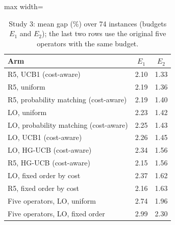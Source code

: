 \begin{table}[t]
\caption{Study 3: mean gap (\%) over 74 instances (budgets $E_1$ and $E_2$); the last two rows use the original five operators with the same budget.}\label{tab:s3}
\centering
\small
\begin{adjustbox}{max width=\linewidth}
\begin{tabular}{lcc}
\toprule
Arm & $E_1$ & $E_2$ \\
\midrule
R5, UCB1 (cost-aware) & 2.10 & 1.33 \\
R5, uniform & 2.19 & 1.36 \\
R5, probability matching (cost-aware) & 2.19 & 1.40 \\
LO, uniform & 2.23 & 1.42 \\
LO, probability matching (cost-aware) & 2.25 & 1.43 \\
LO, UCB1 (cost-aware) & 2.26 & 1.45 \\
LO, HG-UCB (cost-aware) & 2.34 & 1.56 \\
R5, HG-UCB (cost-aware) & 2.15 & 1.56 \\
LO, fixed order by cost & 2.37 & 1.62 \\
\addlinespace
R5, fixed order by cost & 2.16 & 1.63 \\
Five operators, LO, uniform & 2.74 & 1.96 \\
Five operators, LO, fixed order & 2.99 & 2.30 \\
\bottomrule
\end{tabular}
\end{adjustbox}
\end{table}
